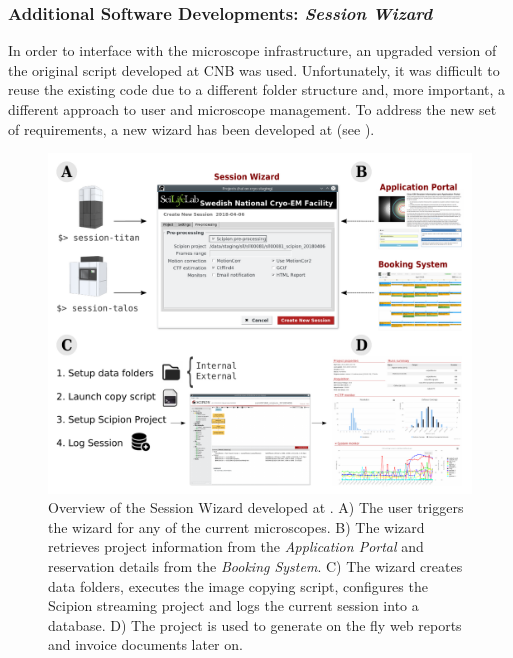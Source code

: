 \subsubsection{Additional Software Developments: \emph{Session Wizard}}
In order to interface \scipion with the microscope infrastructure, an upgraded version of the original script developed at CNB was used. Unfortunately, it was difficult to reuse the existing code due to a different folder structure and, more important, a different approach to user and microscope management. To address the new set of requirements, a new wizard has been developed at \scilifelab (see ). %
\begin{figure}
\hspace*{-2cm}                                                           
\includegraphics[width=1.25\textwidth]{images/scilifelab.pdf}
  \caption{Overview of the Session Wizard  developed at \scilifelab. A) The user triggers the wizard for any of the current microscopes. B) The wizard retrieves project information from the \textit{Application Portal} and reservation details from the \textit{Booking System}. C) The wizard creates data folders, executes the image copying script, configures the Scipion streaming project and logs the current session into a database. D) The \scipion project is used to generate on the fly web reports and invoice documents later on.}
  \label{fig:wizard}

\end{figure}

